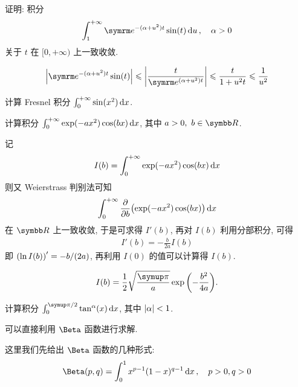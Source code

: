 \begin{exercise}[series=exer]
  \item 证明: 积分
  \begin{align*}
      \int_{1}^{+\infty} \me^{-(\alpha + u^{2})t} \sin(t) \dd{u},\quad \alpha > 0
  \end{align*}
  关于 $ t $ 在 $ [0, +\infty) $ 上一致收敛.
  \begin{hint}
      \begin{align*}
          \abs{\me^{-(\alpha + u^{2})t} \sin(t)} \le \abs{\frac{t}{\me^{(\alpha + u^{2})t}}} \le \frac{t}{1 + u^{2}t} \le \frac{1}{u^{2}}
      \end{align*}
  \end{hint}
  \hitem 计算 Fresnel 积分 $ \int_{0}^{+\infty} \sin(x^{2}) \dx* $.
  \item 计算积分 $ \int_{0}^{+\infty} \exp(-a x^{2})\cos(bx) \dx* $, 其中 $ a > 0,\ b\in \R $.
  \begin{hint}
      记
      \begin{align*}
          I(b) = \int_{0}^{+\infty} \exp(-a x^{2})\cos(bx) \dx*
      \end{align*}
      则又 Weierstrass 判别法可知
      \begin{align*}
          \int_{0}^{+\infty} \pdv{b}\qty(\exp(-a x^{2})\cos(bx)) \dx*
      \end{align*}
      在 $ \R $ 上一致收敛, 于是可求得 $ I'(b) $, 再对 $ I(b) $ 利用分部积分, 可得
      \begin{align*}
          I'(b) = -\frac{b}{2a}I(b)
      \end{align*}
      即 $ \qty(\ln I(b))' = -b/(2a) $, 再利用 $ I(0) $ 的值可以计算得 $ I(b) $.
  \end{hint}
  \begin{answer}
      \begin{align*}
          I(b) = \frac{1}{2}\sqrt{\frac{\pi}{a}}\exp\qty(-\frac{b^{2}}{4a}).
      \end{align*}
  \end{answer}
  \item 计算积分 $ \int_{0}^{\pi/2} \tan^{\alpha}(x) \dx* $, 其中 $ \abs{\alpha} < 1 $.
  \begin{hint}
      可以直接利用 $ \Beta $ 函数进行求解.
  \end{hint}
  \begin{answer}
      这里我们先给出 $ \Beta $ 函数的几种形式:
      \begin{align*}
          \Beta(p, q) = \int_{0}^{1} x^{p - 1}(1 - x)^{q - 1} \dx*,\quad p > 0, q > 0
      \end{align*}

\end{answer}
\end{exercise}
